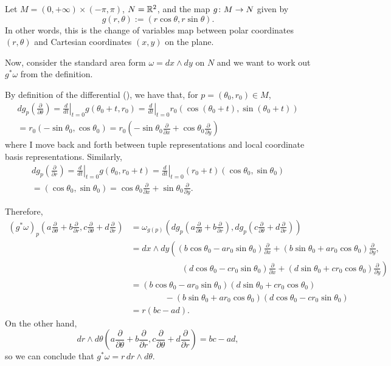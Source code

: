 \begin{example}
	Let $M = (0, +\infty) \times (-\pi, \pi)$, $N = \mathbb{R}^2$, and the map $g\colon\thinspace\! M \to N$ given by
	\[
		g(r, \theta) := (r \cos \theta, r \sin \theta).
	\]
	In other words, this is the change of variables map between polar coordinates $(r, \theta)$ and Cartesian coordinates $(x,y)$ on the plane.
	
	Now, consider the standard area form $\omega = dx \wedge dy$ on $N$ and we want to work out $g^\ast \omega$ from the definition. 
	
	By definition of the differential (), we have that, for $p = (\theta_0, r_0) \in M$, 
	\begin{multline*}
		dg_p\left(\frac{\partial}{\partial \theta} \right) = \left. \frac{d}{dt} \right|_{t=0} g(\theta_0+t,r_0) = \left. \frac{d}{dt} \right|_{t=0} r_0(\cos(\theta_0+t),\sin(\theta_0+t)) \\
		= r_0(-\sin\theta_0,\cos\theta_0) = r_0\left(-\sin\theta_0 \frac{\partial}{\partial x} + \cos \theta_0 \frac{\partial}{\partial y}\right)
	\end{multline*}
	where I move back and forth between tuple representations and local coordinate basis representations. Similarly,
	\begin{multline*}
		dg_p\left(\frac{\partial}{\partial r} \right) = \left. \frac{d}{dt} \right|_{t=0} g(\theta_0,r_0+t) = \left. \frac{d}{dt} \right|_{t=0} (r_0+t)(\cos\theta_0,\sin\theta_0) \\
		= (\cos\theta_0,\sin\theta_0) = \cos\theta_0 \frac{\partial}{\partial x} + \sin \theta_0 \frac{\partial}{\partial y}.
	\end{multline*}
	
	Therefore,
	\begin{align*}
		(g^\ast \omega)_p\left(a \frac{\partial}{\partial \theta} + b \frac{\partial}{\partial r}, c \frac{\partial}{\partial \theta} + d \frac{\partial}{\partial r}\right) & = \omega_{g(p)} \left(dg_p\left(a \frac{\partial}{\partial \theta} + b \frac{\partial}{\partial r}\right), dg_p\left(c \frac{\partial}{\partial \theta} + d \frac{\partial}{\partial r}\right)\right) \\
		& = dx \wedge dy \left((b \cos\theta_0 - a r_0\sin\theta_0) \frac{\partial}{\partial x} + (b\sin \theta_0 +ar_0\cos \theta_0) \frac{\partial}{\partial y}, \right. \\
		& \qquad \qquad \qquad \left. (d \cos\theta_0 - c r_0\sin\theta_0) \frac{\partial}{\partial x} + (d\sin \theta_0 +cr_0\cos \theta_0) \frac{\partial}{\partial y}\right) \\
		& = (b \cos\theta_0 - a r_0\sin\theta_0)(d\sin \theta_0 +cr_0\cos \theta_0) \\
		& \qquad \qquad - (b\sin \theta_0 +ar_0\cos \theta_0)(d \cos\theta_0 - c r_0\sin\theta_0) \\
		& = r(bc-ad).
	\end{align*}
	On the other hand,
	\[
		dr \wedge d\theta \left(a \frac{\partial}{\partial \theta} + b \frac{\partial}{\partial r}, c \frac{\partial}{\partial \theta} + d \frac{\partial}{\partial r}\right) = bc-ad,
	\]
	so we can conclude that $g^\ast \omega = r\, dr \wedge d\theta$.
	

\end{example}

